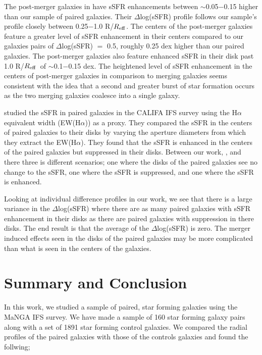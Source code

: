 \documentclass[iop,revtex4,twocolumn,apj,numberedappendix,appendixfloats]{emulateapj}
\newcommand{\reff}{$R_{\rm eff}$}
\newcommand{\ewha}{EW(H$\alpha$)}
\begin{document}
The post-merger galaxies in \citet{Thorp:2019} have sSFR enhancements between $\sim$0.05$-$0.15 higher than our sample of paired galaxies. Their $\Delta$log(sSFR) profile follows our sample's profile closely between 0.25$-$1.0 R/\reff. The centers of the post-merger galaxies feature a greater level of sSFR enhancement in their centers compared to our galaxies pairs of $\Delta$log(sSFR) $=$ 0.5, roughly 0.25 dex higher than our paired galaxies. The post-merger galaxies also feature enhanced sSFR in their disk past 1.0 R/\reff\ of $\sim$0.1$-$0.15 dex. The heightened level of sSFR enhancement in the centers of post-merger galaxies in comparison to merging galaxies seems consistent with the idea that a second and greater burst of star formation occurs as the two merging galaxies coalesce into a single galaxy. 

\citet{Barrera-Ballesteros:2015} studied the sSFR in paired galaxies in the CALIFA IFS survey using the H$\alpha$ equivalent width (\ewha) as a proxy. They compared the sSFR in the centers of paired galaxies to their disks by varying the aperture diameters from which they extract the \ewha. They found that the sSFR is enhanced in the centers of the paired galaxies but suppressed in their disks. Between our work, \citet{Barrera-Ballesteros:2015}, and \citet{Pan:2019} there three is different scenarios; one where the disks of the paired galaxies see no change to the sSFR, one where the sSFR is suppressed, and one where the sSFR is enhanced. 

Looking at individual difference profiles in our work, we see that there is a large variance in the $\Delta$log(sSFR) where there are as many paired galaxies with sSFR enhancement in their disks as there are paired galaxies with suppression in there disks. The end result is that the average of the $\Delta$log(sSFR) is zero. The merger induced effects seen in the disks of the paired galaxies may be more complicated than what is seen in the centers of the galaxies. 


\section{Summary and Conclusion}\label{sec:sum}

In this work, we studied a sample of paired, star forming galaxies using the MaNGA IFS survey. We have made a sample of 160 star forming galaxy pairs along with a set of 1891 star forming control galaxies. We compared the radial profiles of the paired galaxies with those of the controls galaxies and found the follwing;
\end{document}
